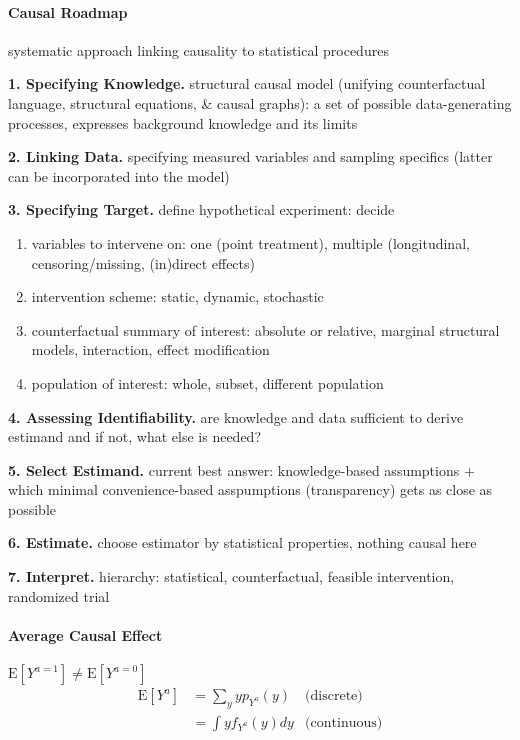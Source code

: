 \documentclass[8pt]{extarticle}
\begin{document}
\begin{multicols}{2}

\paragraph{\large Causal Roadmap} \citep{petersen2014causal} 
systematic approach linking causality to statistical procedures

\noindent \textbf{1. Specifying Knowledge.} structural causal model (unifying counterfactual language, structural equations, \& causal graphs): a set of possible data-generating processes, expresses background knowledge and its limits

\noindent \textbf{2. Linking Data.} specifying measured variables and sampling specifics (latter can be incorporated into the model)

\noindent \textbf{3. Specifying Target.} define hypothetical experiment: decide
\noindent\begin{enumerate}[itemsep=0em, topsep=0pt, partopsep=0pt,parsep=0pt]
\setlength{\itemsep}{0pt}%
\setlength{\parskip}{0pt}
\item variables to intervene on: one (point treatment), multiple (longitudinal, censoring/missing, (in)direct effects)
\item intervention scheme: static, dynamic, stochastic
\item counterfactual summary of interest: absolute or relative, marginal structural models, interaction, effect modification
\item population of interest: whole, subset, different population
\end{enumerate}

\noindent \textbf{4. Assessing Identifiability.} are knowledge and data sufficient to derive estimand and if not, what else is needed?

\noindent \textbf{5. Select Estimand.} current best answer: knowledge-based assumptions $+$ which minimal convenience-based asspumptions (transparency) gets as close as possible

\noindent \textbf{6. Estimate.} choose estimator by statistical properties, nothing causal here

\noindent \textbf{7. Interpret.} hierarchy: statistical, counterfactual, feasible intervention, randomized trial


\paragraph{\large Average Causal Effect} $\mathrm{E}\left[Y^{a=1}\right] \neq \mathrm{E}\left[Y^{a=0}\right]$
\begin{align*}
\mathrm{E}\left[Y^{a}\right]   &=  \sum_yyp_{Y^a}(y)  &\text{(discrete)}\\
   &=  \int yf_{Y^a}(y)dy &\text{(continuous)}
\end{align*}


\end{multicols}
\end{document}
